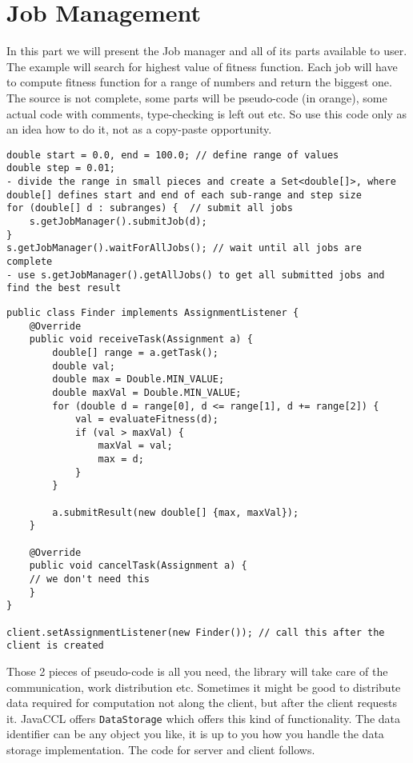 \documentclass[a4paper,12pt]{article}
\newcommand{\classname}[1]{\texttt{#1}}
\begin{document}
\section{Job Management}
In this part we will present the Job manager and all of its parts available to user.  The example will search for highest value of fitness function. Each job will have to compute fitness function for a range of numbers and return the biggest one. The source is not complete, some parts will be pseudo-code (in orange), some actual code with comments, type-checking is left out etc. So use this code only as an idea how to do it, not as a copy-paste opportunity.
\begin{lstlisting}[style=javaPseudo, title=Code for the server part]
double start = 0.0, end = 100.0; // define range of values
double step = 0.01;
- divide the range in small pieces and create a Set<double[]>, where double[] defines start and end of each sub-range and step size
for (double[] d : subranges) {	// submit all jobs
	s.getJobManager().submitJob(d);
}
s.getJobManager().waitForAllJobs();	// wait until all jobs are complete
- use s.getJobManager().getAllJobs() to get all submitted jobs and find the best result
\end{lstlisting}
\begin{lstlisting}[style=javaPseudo, title=Code for the client part]
public class Finder implements AssignmentListener {
	@Override
    public void receiveTask(Assignment a) {
    	double[] range = a.getTask();
    	double val;
    	double max = Double.MIN_VALUE;
    	double maxVal = Double.MIN_VALUE;
    	for (double d = range[0], d <= range[1], d += range[2]) {
    		val = evaluateFitness(d);
    		if (val > maxVal) {
    			maxVal = val;
    			max = d;
    		}
    	}
    	
    	a.submitResult(new double[] {max, maxVal});
    }

    @Override
    public void cancelTask(Assignment a) {
	// we don't need this
    }
}

client.setAssignmentListener(new Finder());	// call this after the client is created
\end{lstlisting}
Those 2 pieces of pseudo-code is all you need, the library will take care of the communication, work distribution etc. Sometimes it might be good to distribute data required for computation not along the client, but after the client requests it. JavaCCL offers \classname{DataStorage} which offers this kind of functionality. The data identifier can be any object you like, it is up to you how you handle the data storage implementation. The code for server and client follows.
\end{document}
